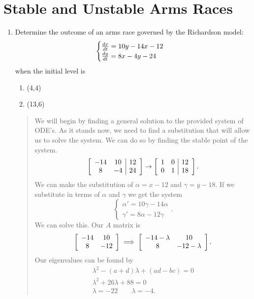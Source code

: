 \documentclass{hw}
\begin{document}
\section{Stable and Unstable Arms Races}
\begin{enumerate}
\item Determine the outcome of an arms race governed by the Richardson model:
\[
\begin{cases}
{dx\over dt}=10y-14x-12\\
{dy\over dt}=8x-4y-24
\end{cases}
\]
when the initial level is
\begin{enumerate}
\item (4,4)
\item (13,6)
\end{enumerate}
\begin{quote}
We will begin by finding a general solution to the provided system of ODE's. As it stands now, we
need to find a substitution that will allow us to solve the system. We can do so by finding the stable
point of the system.
\[
\left[
\begin{array}{c c | c}
-14 & 10 & 12\\
8 & -4 & 24
\end{array}
\right]
\to
\left[
\begin{array}{c c | c}
1 & 0 & 12\\
0 & 1 & 18
\end{array}
\right].
\]
We can make the substitution of $\alpha = x - 12$ and $\gamma = y - 18$. If we substitute in terms
of $\alpha$ and $\gamma$ we get the system
\[
\begin{cases}
\alpha' = 10\gamma - 14\alpha\\
\gamma' = 8\alpha - 12\gamma
\end{cases}.
\]
We can solve this. Our $A$ matrix is
\[
\left[
\begin{array}{c c}
-14 & 10\\
8 & -12
\end{array}
\right]
\implies
\left[
\begin{array}{c c}
-14-\lambda & 10\\
8 & -12-\lambda
\end{array}
\right].
\]
Our eigenvalues can be found by
\begin{gather*}
\lambda^2 -(a+d)\lambda+(ad-bc) = 0\\
\lambda^2 + 26\lambda+88 = 0\\
\lambda = -22\qquad \lambda = -4.
\end{gather*}

\end{quote}
\end{enumerate}
\end{document}

